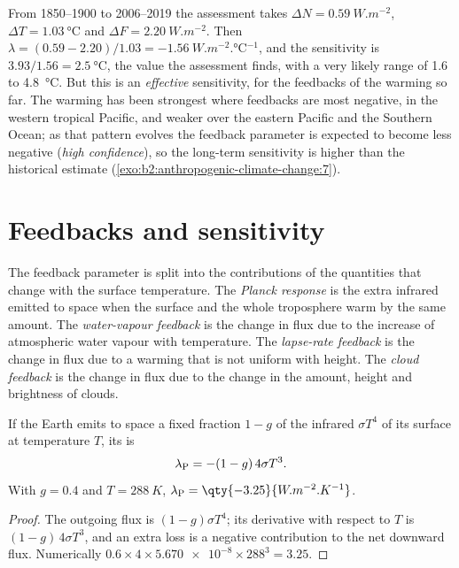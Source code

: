 From 1850--1900 to 2006--2019 the assessment takes $\Delta N = \qty{0.59}{W.m^{-2}}$, $\Delta T =
\qty{1.03}{\celsius}$ and $\Delta F = \qty{2.20}{W.m^{-2}}$. Then $\lambda = (0.59 - 2.20)/1.03 =
\qty{-1.56}{W.m^{-2}.\celsius^{-1}}$, and the sensitivity is $3.93/1.56 = \qty{2.5}{\celsius}$,
the value the assessment finds, with a very likely range of 1.6 to \qty{4.8}{\celsius}. But this is
an \emph{effective} sensitivity, for the feedbacks of the warming so far. The warming has been
strongest where feedbacks are most negative, in the western tropical Pacific, and weaker over the
eastern Pacific and the Southern Ocean; as that pattern evolves the feedback parameter is expected
to become less negative (\emph{high confidence}), so the long-term sensitivity is higher than the
historical estimate (\cref{exo:b2:anthropogenic-climate-change:7}).

\section{Feedbacks and sensitivity}\label{sec:b2:anthropogenic-climate-change:feedbacks}

\begin{definition}\label{def:b2:anthropogenic-climate-change:feedbacks}
The feedback parameter is split into the contributions of the quantities that change with the
surface temperature. The \emph{Planck response} is the extra infrared
emitted to space when the surface and the whole troposphere warm by the same amount. The
\emph{water-vapour feedback} is the change in flux due to the increase
of atmospheric water vapour with temperature. The \emph{lapse-rate feedback} is the change in flux due to a warming that is not uniform with height. The \emph{cloud
feedback} is the change in flux due to the change in the amount, height and
brightness of clouds.
\end{definition}

\begin{proposition}\label{prop:b2:anthropogenic-climate-change:planck}
If the Earth emits to space a fixed fraction $1 - g$ of the infrared $\sigma T^4$ of its surface at
temperature $T$, its  is
\[
  \lambda_{\text P} = -(1 - g)\,4\sigma T^3 .
\]
With $g = 0.4$ and $T = \qty{288}{K}$, $\lambda_{\text P} = \qty{-3.25}{W.m^{-2}.K^{-1}}$.
\end{proposition}
\begin{proof}
The outgoing flux is $(1 - g)\sigma T^4$; its derivative with respect to $T$ is $(1 - g)\,4\sigma
T^3$, and an extra loss is a negative contribution to the net downward flux. Numerically $0.6
\times 4 \times \num{5.670e-8} \times 288^3 = 3.25$.
\end{proof}


